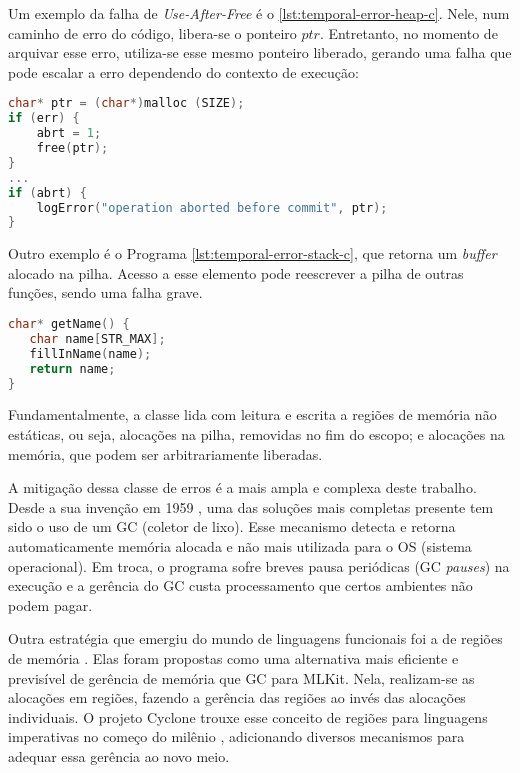 Um exemplo da falha de \emph{Use-After-Free} é o \autoref{lst:temporal-error-heap-c}. Nele, num caminho de erro do código, libera-se o ponteiro $ptr$. Entretanto, no momento de arquivar esse erro, utiliza-se esse mesmo ponteiro liberado, gerando uma falha que pode escalar a erro dependendo do contexto de execução:
\begin{lstlisting}[language=C, label={lst:temporal-error-heap-c}, caption=Exemplo de uma Falha Temporal na \emph{Heap}]
char* ptr = (char*)malloc (SIZE);  
if (err) {
	abrt = 1;  
	free(ptr);
}  
...  
if (abrt) {
	logError("operation aborted before commit", ptr);
}
\end{lstlisting}

Outro exemplo é o Programa \ref{lst:temporal-error-stack-c}, que retorna um \emph{buffer} alocado na pilha. Acesso a esse elemento pode reescrever a pilha de outras funções, sendo uma falha grave.

\begin{lstlisting}[language=C, label={lst:temporal-error-stack-c}, caption=Exemplo de uma Falha Temporal na Pilha]
char* getName() {
   char name[STR_MAX];  
   fillInName(name);  
   return name;
}
\end{lstlisting}

Fundamentalmente, a classe lida com leitura e escrita a regiões de memória não estáticas, ou seja, alocações na pilha, removidas no fim do escopo; e alocações na memória, que podem ser arbitrariamente liberadas.


\label{sec:mem-error:GC}
A mitigação dessa classe de erros é a mais ampla e complexa deste trabalho. Desde a sua invenção em 1959 \cite{GCSTART}, uma das soluções mais completas presente tem sido o uso de um GC (coletor de lixo). Esse mecanismo detecta e retorna automaticamente memória alocada e não mais utilizada para o OS (sistema operacional). Em troca, o programa sofre breves pausa periódicas (GC \emph{pauses}) na execução e a gerência do GC custa processamento que certos ambientes não podem pagar.

\label{sec:mem-error:MemReg}
Outra estratégia que emergiu do mundo de linguagens funcionais foi a de regiões de memória \cite{REGMEM}. Elas foram propostas como uma alternativa mais eficiente e previsível de gerência de memória que GC para MLKit. Nela, realizam-se as alocações em regiões, fazendo a gerência das regiões ao invés das alocações individuais. O projeto Cyclone trouxe esse conceito de regiões para linguagens imperativas no começo do milênio \cite{CYCLONEMEM}, adicionando diversos mecanismos para adequar essa gerência ao novo meio.

